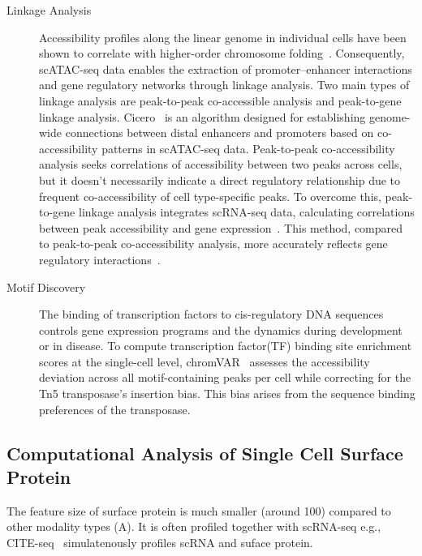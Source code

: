 \begin{description}
	\item[Linkage Analysis]
	Accessibility profiles along the linear genome in individual cells have been shown to correlate with higher-order chromosome folding~\citep{Buenrostro2015}. Consequently, scATAC-seq data enables the extraction of promoter–enhancer interactions and gene regulatory networks through linkage analysis. Two main types of linkage analysis are peak-to-peak co-accessible analysis and peak-to-gene linkage analysis. Cicero~\citep{pliner2018cicero} is an algorithm designed for establishing genome-wide connections between distal enhancers and promoters based on co-accessibility patterns in scATAC-seq data. Peak-to-peak co-accessibility analysis seeks correlations of accessibility between two peaks across cells, but it doesn't necessarily indicate a direct regulatory relationship due to frequent co-accessibility of cell type-specific peaks. To overcome this, peak-to-gene linkage analysis integrates scRNA-seq data, calculating correlations between peak accessibility and gene expression~\citep{Granja2021}. This method, compared to peak-to-peak co-accessibility analysis, more accurately reflects gene regulatory interactions~\citep{shi2022scatacoverview}.

	\item[Motif Discovery]
	The binding of transcription factors to cis-regulatory DNA sequences controls gene expression programs and the dynamics during development or in disease. To compute transcription factor(TF) binding site enrichment scores at the single-cell level, chromVAR~\citep{schep2017chromvar} assesses the accessibility deviation across all motif-containing peaks per cell while correcting for the Tn5 transposase's insertion bias. This bias arises from the sequence binding preferences of the transposase.

\end{description}

\subsection{Computational Analysis of Single Cell Surface Protein}
\label{background:sec2:protein}
The feature size of surface protein is much smaller (around 100) compared to other modality types (A). It is often profiled together with scRNA-seq e.g., CITE-seq~\citep{citeseq2017} simulatenously profiles scRNA and suface protein.

